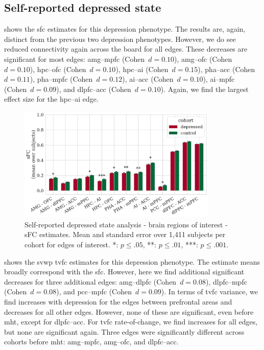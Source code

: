 \clearpage
\subsection{Self-reported depressed state}

 shows the \gls{sfc} estimates for this depression phenotype.
The results are, again, distinct from the previous two depression phenotypes.
%
However, we do see reduced connectivity again across the board for all edges.
These decreases are significant for most edges: \gls{amg}--\gls{mpfc} (Cohen~$d = 0.10$), \gls{amg}--\gls{ofc} (Cohen~$d = 0.10$), \gls{hpc}--\gls{ofc} (Cohen~$d = 0.10$), \gls{hpc}--\gls{ai} (Cohen~$d = 0.15$), \gls{pha}--\gls{acc} (Cohen~$d = 0.11$), \gls{pha}--\gls{mpfc} (Cohen~$d = 0.12$), \gls{ai}--\gls{acc} (Cohen~$d = 0.10$), \gls{ai}--\gls{mpfc} (Cohen~$d = 0.09$), and \gls{dlpfc}--\gls{acc} (Cohen~$d = 0.10$).
Again, we find the largest effect size for the \gls{hpc}--\gls{ai} edge.


\begin{figure}[h]
  \centering
  \includegraphics[width=0.85\textwidth]{fig/ukbiobank/TVFC_predictions_summaries/self_reported_depression_state/cohort_comparison/ROI/correlation_TVFC_mean_sFC_edges_of_interest}
  \caption{
    Self-reported depressed state analysis - brain regions of interest - sFC estimates.
    Mean and standard error over 1,411 subjects per cohort for edges of interest.
    *: $p \leq .05$, **: $p \leq .01$, ***: $p \leq .001$.
  }\label{fig:ukb-results-srds-roi-cohort-comparison-edges-of-interest-sfc}
\end{figure}


 shows the \gls{svwp} \gls{tvfc} estimates for this depression phenotype.
%
The estimate means broadly correspond with the \gls{sfc}.
However, here we find additional significant decreases for three additional edges: \gls{amg}--\gls{dlpfc} (Cohen~$d = 0.08$), \gls{dlpfc}--\gls{mpfc} (Cohen~$d = 0.08$), and \gls{pcc}--\gls{mpfc} (Cohen~$d = 0.09$).
%
In terms of \gls{tvfc} variance, we find increases with depression for the edges between prefrontal areas and decreases for all other edges.
However, none of these are significant, even before \gls{mht}, except for \gls{dlpfc}--\gls{acc}.
%
For \gls{tvfc} rate-of-change, we find increases for all edges, but none are significant again.
Three edges were significantly different across cohorts before \gls{mht}: \gls{amg}--\gls{mpfc}, \gls{amg}--\gls{ofc}, and \gls{dlpfc}--\gls{acc}.


